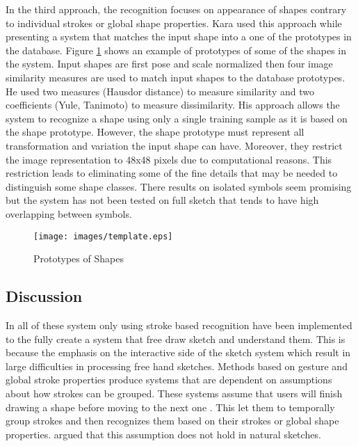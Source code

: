 In the third approach, the recognition focuses on appearance of shapes contrary to individual strokes or global shape properties. Kara \cite{imagetrainable48} used this approach while presenting a system that matches the input shape into a one of the prototypes in the database. Figure \ref{fig:template} shows an example of prototypes of some of the shapes in the system. Input shapes are first pose and scale normalized then four image similarity measures are used to match input shapes to the database prototypes. He used two measures (Hausdor distance) to measure similarity and two coefficients (Yule, Tanimoto) to measure dissimilarity. His approach allows the system to recognize a shape using only a single training sample as it is based on the shape prototype. However, the shape prototype must represent all transformation and variation the input shape can have. Moreover, they restrict the image representation to 48x48 pixels due to computational reasons. This restriction leads to eliminating some of the fine details that may be needed to distinguish some shape classes. There results on isolated symbols seem promising but the system has not been tested on full sketch that tends to have high overlapping between symbols. 
\begin{figure}
	\centering
		\texttt{[image: images/template.eps]}
	\caption[Prototypes of Shapes]{Prototypes of Shapes \cite{imagetrainable48}}
	\label{fig:template}
\end{figure}

\subsection{Discussion}
\label{sec:discuss}

In all of these system only \cite{SketchRead2007} using stroke based recognition have been implemented to the fully create a system that free draw sketch and understand them. This is because the emphasis on the interactive side of the sketch system which result in large difficulties in processing free hand sketches. Methods based on gesture and global stroke properties produce systems that are dependent on assumptions about how strokes can be grouped. These systems assume that users will finish drawing a shape before moving to the next one \cite{multistrokeEvaluation,Cali63,geometrydomain49}. This let them to temporally group strokes and then recognizes them based on their strokes or global shape properties. \cite{AlvaradoDigital} argued that this assumption does not hold in natural sketches. 

